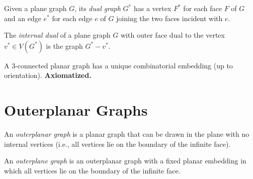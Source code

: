 \begin{definition}
  \label{def:dual_graph}
  \notready
  Given a plane graph $G$, its \emph{dual graph} $G^*$ has a vertex $F^*$
  for each face $F$ of $G$ and an edge $e^*$ for each edge $e$ of $G$
  joining the two faces incident with $e$.
\end{definition}

\begin{definition}
  \label{def:internal_dual}
  \notready
  The \emph{internal dual} of a plane graph $G$ with outer face dual to the
  vertex $v^* \in V(G^*)$ is the graph $G^* - v^*$.
\end{definition}

\begin{theorem}
  \label{thm:whitney}
  \notready
  A $3$-connected planar graph has a unique combinatorial embedding (up to
  orientation). \textbf{Axiomatized.}
\end{theorem}


\section{Outerplanar Graphs}

\begin{definition}
  \label{def:outerplanar}
  \notready
  An \emph{outerplanar graph} is a planar graph that can be drawn in the
  plane with no internal vertices (i.e., all vertices lie on the boundary
  of the infinite face).
\end{definition}

\begin{definition}
  \label{def:outerplane}
  \notready
  An \emph{outerplane graph} is an outerplanar graph with a fixed planar
  embedding in which all vertices lie on the boundary of the infinite face.
\end{definition}

